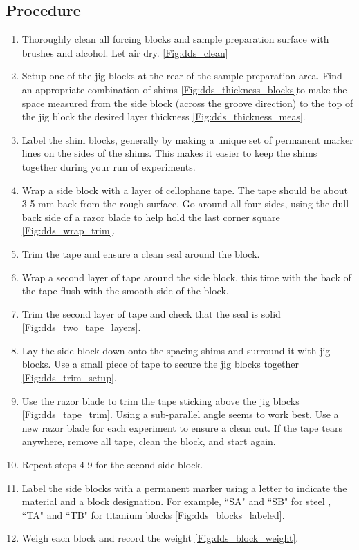 \subsection{Procedure}
\begin{enumerate}
\item Thoroughly clean all forcing blocks and sample preparation surface with brushes and alcohol. Let air dry. \ref{Fig:dds_clean}
\item Setup one of the jig blocks at the rear of the sample preparation area. Find an appropriate combination of shims \ref{Fig:dds_thickness_blocks}to make the space measured from the side block (across the groove direction) to the top of the jig block the desired layer thickness \ref{Fig:dds_thickness_meas}.
\item Label the shim blocks, generally by making a unique set of permanent marker lines on the sides of the shims. This makes it easier to keep the shims together during your run of experiments.
\item Wrap a side block with a layer of cellophane tape. The tape should be about 3-5 mm back from the rough surface. Go around all four sides, using the dull back side of a razor blade to help hold the last corner square \ref{Fig:dds_wrap_trim}.
\item Trim the tape and ensure a clean seal around the block.
\item Wrap a second layer of tape around the side block, this time with the back of the tape flush with the smooth side of the block.
\item Trim the second layer of tape and check that the seal is solid \ref{Fig:dds_two_tape_layers}.
\item Lay the side block down onto the spacing shims and surround it with jig blocks. Use a small piece of tape to secure the jig blocks together \ref{Fig:dds_trim_setup}.
\item Use the razor blade to trim the tape sticking above the jig blocks \ref{Fig:dds_tape_trim}. Using a sub-parallel angle seems to work best. Use a new razor blade for each experiment to ensure a clean cut. If the tape tears anywhere, remove all tape, clean the block, and start again.
\item Repeat steps 4-9 for the second side block.
\item Label the side blocks with a permanent marker using a letter to indicate the material and a block designation. For example, ``SA" and ``SB" for steel , ``TA" and ``TB" for titanium blocks \ref{Fig:dds_blocks_labeled}.
\item Weigh each block and record the weight \ref{Fig:dds_block_weight}.

\end{enumerate}
